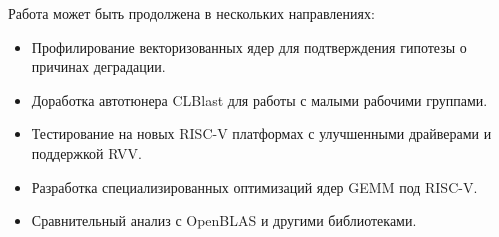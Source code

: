 Работа может быть продолжена в нескольких направлениях:

\begin{itemize}
\item Профилирование векторизованных ядер для подтверждения гипотезы о причинах деградации.
\item Доработка автотюнера CLBlast для работы с малыми рабочими группами.
\item Тестирование на новых RISC-V платформах с улучшенными драйверами и поддержкой RVV.
\item Разработка специализированных оптимизаций ядер GEMM под RISC-V.
\item Сравнительный анализ с OpenBLAS и другими библиотеками.
\end{itemize}